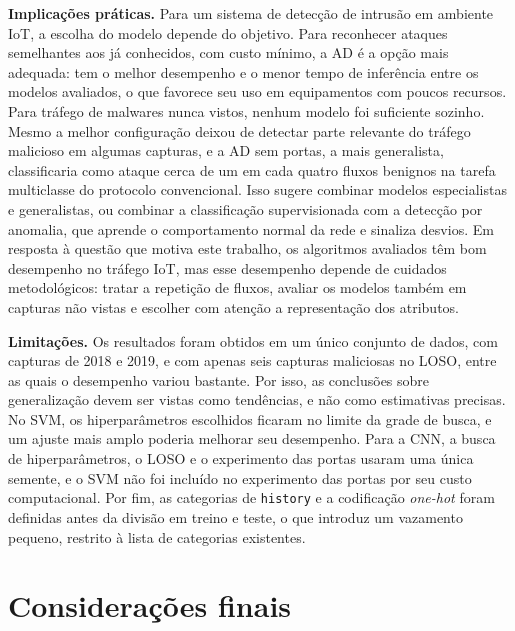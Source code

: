 \documentclass[alpha-refs,brazilian]{CC-EC_TF-TC}
\begin{document}
\textbf{Implicações práticas.} Para um sistema de detecção de intrusão em ambiente IoT, a escolha do modelo depende do objetivo. Para reconhecer ataques semelhantes aos já conhecidos, com custo mínimo, a AD é a opção mais adequada: tem o melhor desempenho e o menor tempo de inferência entre os modelos avaliados, o que favorece seu uso em equipamentos com poucos recursos. Para tráfego de malwares nunca vistos, nenhum modelo foi suficiente sozinho. Mesmo a melhor configuração deixou de detectar parte relevante do tráfego malicioso em algumas capturas, e a AD sem portas, a mais generalista, classificaria como ataque cerca de um em cada quatro fluxos benignos na tarefa multiclasse do protocolo convencional. Isso sugere combinar modelos especialistas e generalistas, ou combinar a classificação supervisionada com a detecção por anomalia, que aprende o comportamento normal da rede e sinaliza desvios. Em resposta à questão que motiva este trabalho, os algoritmos avaliados têm bom desempenho no tráfego IoT, mas esse desempenho depende de cuidados metodológicos: tratar a repetição de fluxos, avaliar os modelos também em capturas não vistas e escolher com atenção a representação dos atributos.

\textbf{Limitações.} Os resultados foram obtidos em um único conjunto de dados, com capturas de 2018 e 2019, e com apenas seis capturas maliciosas no LOSO, entre as quais o desempenho variou bastante. Por isso, as conclusões sobre generalização devem ser vistas como tendências, e não como estimativas precisas. No SVM, os hiperparâmetros escolhidos ficaram no limite da grade de busca, e um ajuste mais amplo poderia melhorar seu desempenho. Para a CNN, a busca de hiperparâmetros, o LOSO e o experimento das portas usaram uma única semente, e o SVM não foi incluído no experimento das portas por seu custo computacional. Por fim, as categorias de \texttt{history} e a codificação \textit{one-hot} foram definidas antes da divisão em treino e teste, o que introduz um vazamento pequeno, restrito à lista de categorias existentes.


\section{Considerações finais}
\label{sec:conclusao}
\end{document}
